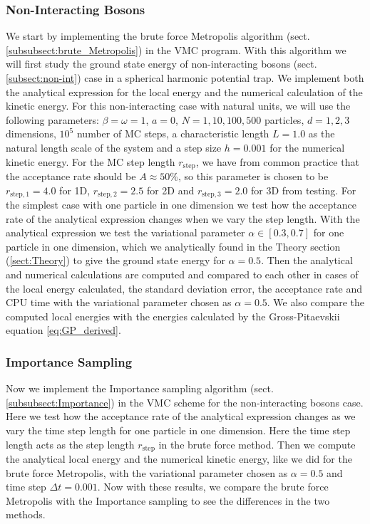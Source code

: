 \documentclass[12pt,a4paper,english]{article}
\begin{document}
\subsubsection{Non-Interacting Bosons}
\label{subsubsect:Coding_non-int}
We start by implementing the brute force Metropolis algorithm (sect. \ref{subsubsect:brute_Metropolis}) in the VMC program. With this algorithm we will first study the ground state energy of non-interacting bosons (sect. \ref{subsect:non-int}) case in a spherical harmonic potential trap. We implement both the analytical expression for the local energy and the numerical calculation of the kinetic energy. For this non-interacting case with natural units, we will use the following parameters: $\beta=\omega=1$, $a=0$, $N=1,10,100,500$ particles, $d=1,2,3$ dimensions, $10^5$ number of MC steps, a characteristic length $L=1.0$ as the natural length scale of the system and a step size $h=0.001$ for the numerical kinetic energy. For the MC step length $r_{\text{step}}$, we have from common practice that the acceptance rate should be $A\approx50$\%, so this parameter is chosen to be $r_{\text{step},1}=4.0$ for 1D, $r_{\text{step},2}=2.5$ for 2D and $r_{\text{step},3}=2.0$ for 3D from testing. For the simplest case with one particle in one dimension we test how the acceptance rate of the analytical expression changes when we vary the step length. With the analytical expression we test the variational parameter $\alpha\in[0.3,0.7]$ for one particle in one dimension, which we analytically found in the Theory section (\ref{sect:Theory}) to give the ground state energy for $\alpha=0.5$. Then the analytical and numerical calculations are computed and compared to each other in cases of the local energy calculated, the standard deviation error, the acceptance rate and CPU time with the variational parameter chosen as $\alpha=0.5$. We also compare the computed local energies with the energies calculated by the Gross-Pitaevskii equation \ref{eq:GP_derived}.
 
\subsubsection{Importance Sampling}
\label{subsubsect:Coding_importance}
Now we implement the Importance sampling algorithm (sect. \ref{subsubsect:Importance}) in the VMC scheme for the non-interacting bosons case. Here we test how the acceptance rate of the analytical expression changes as we vary the time step length for one particle in one dimension. Here the time step length acts as the step length $r_{\text{step}}$ in the brute force method. Then we compute the analytical local energy and the numerical kinetic energy, like we did for the brute force Metropolis, with the variational parameter chosen as $\alpha=0.5$ and time step $\Delta t=0.001$. Now with these results, we compare the brute force Metropolis with the Importance sampling to see the differences in the two methods.
\end{document}
